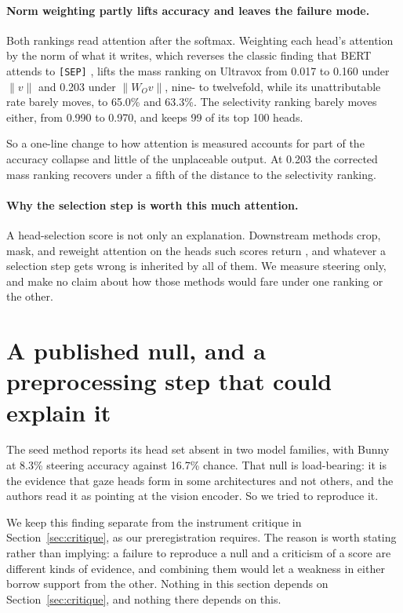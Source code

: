 \documentclass[11pt]{article}
\begin{document}
\paragraph{Norm weighting partly lifts accuracy and leaves the failure mode.}
Both rankings read attention after the softmax. Weighting each head's attention
by the norm of what it writes, which reverses the classic finding that BERT
attends to \texttt{[SEP]} \citep{kobayashi2020attention}, lifts the mass ranking
on Ultravox from 0.017 to 0.160 under $\lVert v \rVert$ and 0.203 under
$\lVert W_O v \rVert$, nine- to twelvefold, while its unattributable rate barely
moves, to 65.0\% and 63.3\%. The selectivity ranking barely moves either, from
0.990 to 0.970, and keeps 99 of its top 100 heads.

So a one-line change to how attention is measured accounts for part of the
accuracy collapse and little of the unplaceable output. At 0.203 the corrected
mass ranking recovers under a fifth of the distance to the selectivity
ranking.

\paragraph{Why the selection step is worth this much attention.}
A head-selection score is not only an explanation. Downstream methods crop, mask,
and reweight attention on the heads such scores return
\citep{zhangma2026ibs,maskcd2025,kang2025sink}, and whatever a selection step
gets wrong is inherited by all of them. We measure steering only, and make no
claim about how those methods would fare under one ranking or the other.

\section{A published null, and a preprocessing step that could explain it}
\label{sec:null}

The seed method reports its head set absent in two model families, with Bunny at
8.3\% steering accuracy against 16.7\% chance. That null is load-bearing: it is
the evidence that gaze heads form in some architectures and not others, and the
authors read it as pointing at the vision encoder. So we tried to reproduce it.

We keep this finding separate from the instrument critique in
Section~\ref{sec:critique}, as our preregistration requires. The reason is worth
stating rather than implying: a failure to reproduce a null and a criticism of a
score are different kinds of evidence, and combining them would let a weakness in
either borrow support from the other. Nothing in this section depends on
Section~\ref{sec:critique}, and nothing there depends on this.
\end{document}
